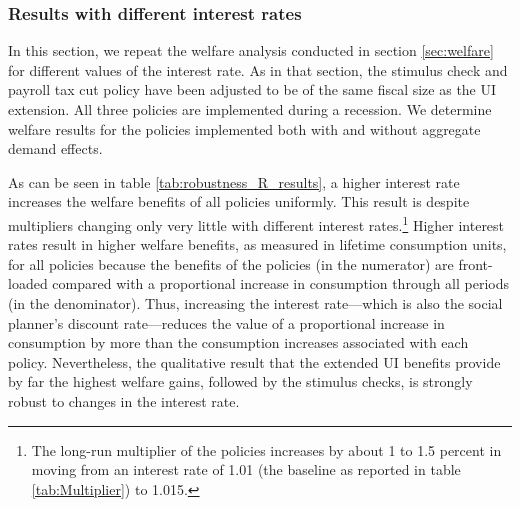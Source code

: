 \documentclass[../HAFiscal]{subfiles}
\begin{document}
\subsubsection{Results with different interest rates}
\label{sec:robust_R_results}

In this section, we repeat the welfare analysis conducted in section \ref{sec:welfare} for different values of the interest rate. As in that section, the stimulus check and payroll tax cut policy have been adjusted to be of the same fiscal size as the UI extension. All three policies are implemented during a recession. We determine welfare results for the policies implemented both with and without aggregate demand effects.

As can be seen in table \ref{tab:robustness_R_results}, a higher interest rate increases the welfare benefits of all policies uniformly. This result is despite multipliers changing only very little with different interest rates.\footnote{The long-run multiplier of the policies increases by about 1 to 1.5 percent in moving from an interest rate of 1.01 (the baseline as reported in table \ref{tab:Multiplier}) to 1.015.} Higher interest rates result in higher welfare benefits, as measured in lifetime consumption units, for all policies because the benefits of the policies (in the numerator) are front-loaded compared with a proportional increase in consumption through all periods (in the denominator). Thus, increasing the interest rate---which is also the social planner's discount rate---reduces the value of a proportional increase in consumption by more than the consumption increases associated with each policy.  Nevertheless, the qualitative result that the extended UI benefits provide by far the highest welfare gains, followed by the stimulus checks, is strongly robust to changes in the interest rate.
\end{document}
